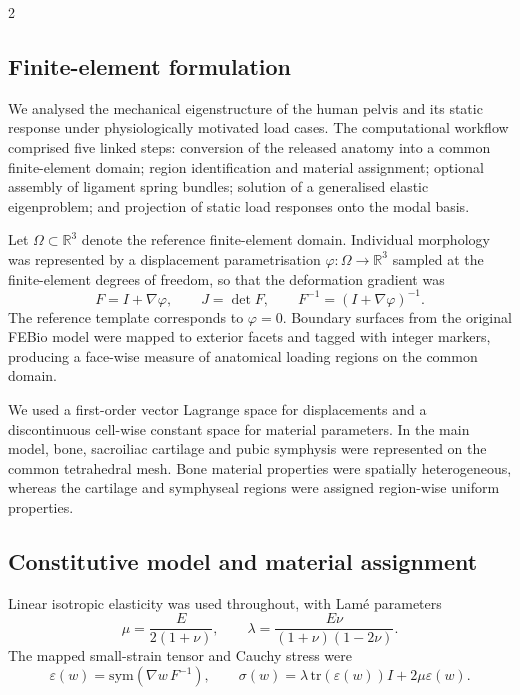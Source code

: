 \documentclass[openacc]{rsproca_new}
\begin{document}
\begin{multicols}{2}
\subsection{Finite-element formulation}

We analysed the mechanical eigenstructure of the human pelvis and its static response under physiologically motivated load cases. The computational workflow comprised five linked steps: conversion of the released anatomy into a common finite-element domain; region identification and material assignment; optional assembly of ligament spring bundles; solution of a generalised elastic eigenproblem; and projection of static load responses onto the modal basis.

Let $\Omega \subset \mathbb{R}^{3}$ denote the reference finite-element domain. Individual morphology was represented by a displacement parametrisation $\varphi:\Omega \rightarrow \mathbb{R}^{3}$ sampled at the finite-element degrees of freedom, so that the deformation gradient was
\begin{equation}
F = I + \nabla \varphi, \qquad J = \det F, \qquad F^{-1} = (I + \nabla \varphi)^{-1}.
\end{equation}
The reference template corresponds to $\varphi=0$. Boundary surfaces from the original FEBio model were mapped to exterior facets and tagged with integer markers, producing a face-wise measure of anatomical loading regions on the common domain.

We used a first-order vector Lagrange space for displacements and a discontinuous cell-wise constant space for material parameters. In the main model, bone, sacroiliac cartilage and pubic symphysis were represented on the common tetrahedral mesh. Bone material properties were spatially heterogeneous, whereas the cartilage and symphyseal regions were assigned region-wise uniform properties.

\subsection{Constitutive model and material assignment}

Linear isotropic elasticity was used throughout, with Lam\'e parameters
\begin{equation}
\mu = \frac{E}{2(1+\nu)}, \qquad
\lambda = \frac{E\nu}{(1+\nu)(1-2\nu)}.
\end{equation}
The mapped small-strain tensor and Cauchy stress were
\begin{equation}
\varepsilon(w)=\mathrm{sym}(\nabla w\,F^{-1}), \qquad
\sigma(w)=\lambda\,\mathrm{tr}(\varepsilon(w))I+2\mu\varepsilon(w).
\end{equation}


\end{multicols}
\end{document}
